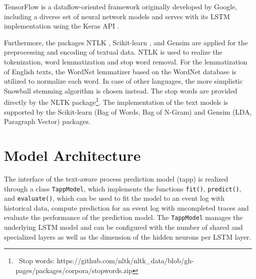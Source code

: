 TensorFlow \cite{DBLP:journals/corr/AbadiABBCCCDDDG16} is a dataflow-oriented framework originally developed by Google, including a diverse set of neural network models and serves with its LSTM implementation using the Keras API \cite{chollet2015keras}.

Furthermore, the packages NTLK \cite{DBLP:books/daglib/0022921}, Scikit-learn \cite{DBLP:journals/jmlr/PedregosaVGMTGBPWDVPCBPD11}, and Gensim \cite{rehurek_lrec} are applied for the preprocessing and encoding of textual data.
NTLK is used to realize the tokenization, word lemmatization and stop word removal.
For the lemmatization of English texts, the WordNet lemmatizer based on the WordNet database \cite{miller1998wordnet} is utilized to normalize each word.
In case of other languages, the more simplistic Snowball stemming algorithm \cite{porter2001snowball} is chosen instead.
The stop words are provided directly by the NLTK package\footnote{\, Stop words: https://github.com/nltk/nltk\_data/blob/gh-pages/packages/corpora/stopwords.zip}.
The implementation of the text models is supported by the Scikit-learn (Bag of Words, Bag of N-Gram) and Gensim (LDA, Paragraph Vector) packages.


\section{Model Architecture}\label{sec:model-implementation}

The interface of the text-aware process prediction model (tapp) is realized through a class \texttt{TappModel}, which implements the functions \texttt{fit()},  \texttt{predict()}, and  \texttt{evaluate()}, which can be used to fit the model to an event log with historical data, compute prediction for an event log with uncompleted traces and evaluate the performance of the prediction model.
The \texttt{TappModel} manages the underlying LSTM model and can be configured with the number of shared and specialized layers as well as the dimension of the hidden neurons per LSTM layer.

